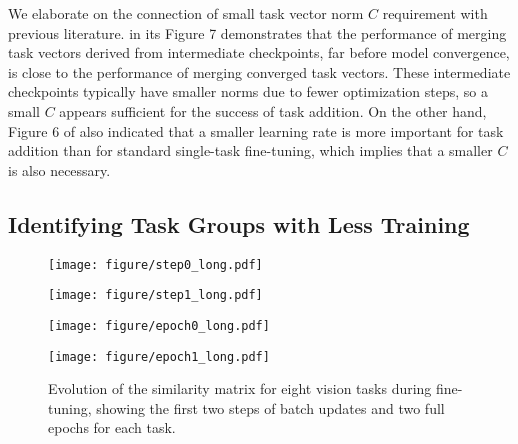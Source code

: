 We elaborate on the connection of small task vector norm $C$ requirement with previous literature. \citet{ilharco2022editing} in its Figure 7 demonstrates that the performance of merging task vectors derived from intermediate checkpoints, far before model convergence, is close to the performance of merging converged task vectors. These intermediate checkpoints typically have smaller norms due to fewer optimization steps, so a small $C$ appears sufficient for the success of task addition. On the other hand, Figure 6 of \citet{ilharco2022editing} also indicated that a smaller learning rate is more important for task addition than for standard single-task fine-tuning, which implies that a smaller $C$ is also necessary. 

\subsection{Identifying Task Groups with Less Training}
\label{sec:intermediate}
\begin{figure}[!ht]
    \centering
    \begin{minipage}[b]{0.23\textwidth}
        \centering
        \texttt{[image: figure/step0\_long.pdf]} %
    \end{minipage}
    \hfill
    \begin{minipage}[b]{0.23\textwidth}
        \centering
        \texttt{[image: figure/step1\_long.pdf]} %
    \end{minipage}
    \hfill
    \begin{minipage}[b]{0.23\textwidth}
        \centering
        \texttt{[image: figure/epoch0\_long.pdf]} %
    \end{minipage}
    \hfill
    \begin{minipage}[b]{0.23\textwidth}
        \centering
        \texttt{[image: figure/epoch1\_long.pdf]} %
    \end{minipage}
    \caption{Evolution of the similarity matrix for eight vision tasks during fine-tuning, showing the first two steps of batch updates and two full epochs for each task.}
    \label{fig:4_images_inline}
\end{figure}

